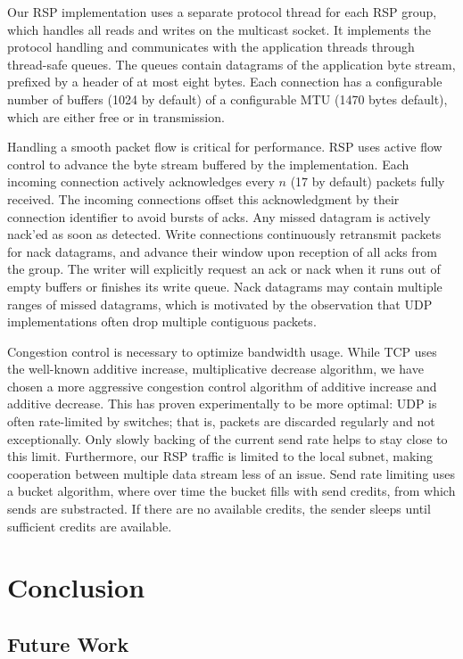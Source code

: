 Our RSP implementation uses a separate protocol thread for each RSP group, which
handles all reads and writes on the multicast socket. It implements the protocol
handling and communicates with the application threads through thread-safe
queues. The queues contain datagrams of the application byte stream, prefixed by
a header of at most eight bytes. Each connection has a configurable number of
buffers (1024 by default) of a configurable MTU (1470 bytes default), which are
either free or in transmission.

Handling a smooth packet flow is critical for performance. RSP uses active flow
control to advance the byte stream buffered by the implementation. Each incoming
connection actively acknowledges every $n$ (17 by default) packets fully
received. The incoming connections offset this acknowledgment by their
connection identifier to avoid bursts of acks. Any missed datagram is actively
nack'ed as soon as detected. Write connections continuously retransmit packets
for nack datagrams, and advance their window upon reception of all acks from the
group. The writer will explicitly request an ack or nack when it runs out of
empty buffers or finishes its write queue. Nack datagrams may contain multiple
ranges of missed datagrams, which is motivated by the observation that UDP
implementations often drop multiple contiguous packets.

Congestion control is necessary to optimize bandwidth usage. While TCP uses the
well-known additive increase, multiplicative decrease algorithm, we have chosen
a more aggressive congestion control algorithm of additive increase and additive
decrease. This has proven experimentally to be more optimal: UDP is often
rate-limited by switches; that is, packets are discarded regularly and not
exceptionally. Only slowly backing of the current send rate helps to stay close
to this limit. Furthermore, our RSP traffic is limited to the local subnet,
making cooperation between multiple data stream less of an issue. Send rate
limiting uses a bucket algorithm, where over time the bucket fills with send
credits, from which sends are substracted. If there are no available credits,
the sender sleeps until sufficient credits are available.

\chapter{Conclusion}

\section{Future Work}


